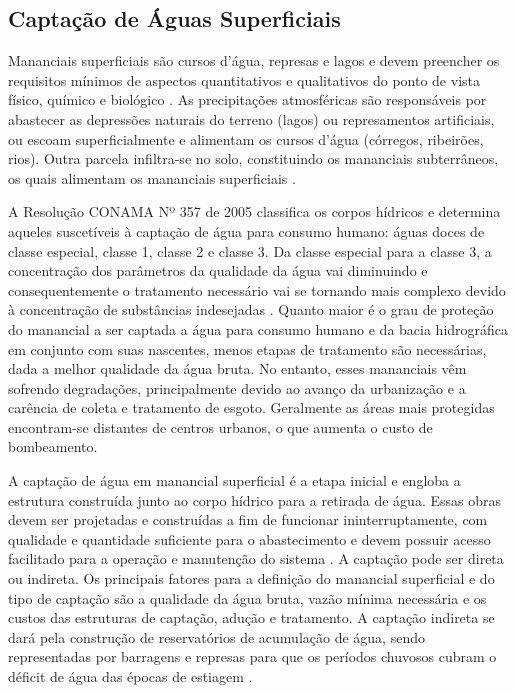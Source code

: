 \subsection{Captação de Águas Superficiais}

Mananciais superficiais são cursos d'água, represas e lagos  \cite{brasila} e devem preencher os requisitos mínimos de aspectos quantitativos e qualitativos do ponto de vista físico, químico e biológico \cite{Tsutiya}. As precipitações atmosféricas são responsáveis por abastecer as depressões naturais do terreno (lagos) ou represamentos artificiais, ou escoam superficialmente e alimentam os cursos d’água (córregos, ribeirões, rios). Outra parcela infiltra-se no solo, constituindo os mananciais subterrâneos, os quais alimentam os mananciais superficiais \cite{brasilb}.  

A Resolução CONAMA Nº 357 de 2005 classifica os corpos hídricos e determina aqueles suscetíveis à captação de água para consumo humano: águas doces de classe especial, classe 1, classe 2 e classe 3. Da classe especial para a classe 3, a concentração dos parâmetros da qualidade da água vai diminuindo e consequentemente o tratamento necessário vai se tornando mais complexo devido à concentração de substâncias indesejadas \cite{conama357}. Quanto maior é o grau de proteção do manancial a ser captada a água para consumo humano e da bacia hidrográfica em conjunto com suas nascentes, menos etapas de tratamento são necessárias, dada a melhor qualidade da água bruta. No entanto, esses mananciais vêm sofrendo degradações, principalmente devido ao avanço da urbanização e a carência de coleta e tratamento de esgoto. Geralmente as áreas mais protegidas encontram-se distantes de centros urbanos, o que aumenta o custo de bombeamento.     

A captação de água em manancial superficial é a etapa inicial e engloba a estrutura construída junto ao corpo hídrico para a retirada de água. Essas obras devem ser projetadas e construídas a fim de funcionar ininterruptamente, com qualidade e quantidade suficiente para o abastecimento e devem possuir acesso facilitado para a operação e manutenção do sistema \cite{Tsutiya}. A captação pode ser direta ou indireta. Os principais fatores para a definição do manancial superficial e do tipo de captação são a qualidade da água bruta, vazão mínima necessária e os custos das estruturas de captação, adução e tratamento. A captação indireta se dará pela construção de reservatórios de acumulação de água, sendo representadas por barragens e represas para que os períodos chuvosos cubram o déficit de água das épocas de estiagem \cite{brasilb}.

